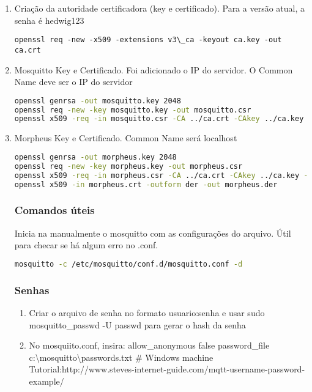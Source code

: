 \begin{enumerate}
\item
Criação da autoridade certificadora (key e certificado). Para a versão atual, a senha é hedwig123

\lstinline{openssl req -new -x509 -extensions v3\_ca -keyout ca.key -out ca.crt}
\item
Mosquitto Key e Certificado. Foi adicionado o IP do servidor. O Common Name deve ser o IP do servidor

\begin{lstlisting}[language=bash]
openssl genrsa -out mosquitto.key 2048
openssl req -new -key mosquitto.key -out mosquitto.csr
openssl x509 -req -in mosquitto.csr -CA ../ca.crt -CAkey ../ca.key -CAcreateserial -out mosquitto.crt -days 3650 -sha256    
\end{lstlisting}

\item
Morpheus Key e Certificado. Common Name será localhost

\begin{lstlisting}[language=bash]
openssl genrsa -out morpheus.key 2048
openssl req -new -key morpheus.key -out morpheus.csr
openssl x509 -req -in morpheus.csr -CA ../ca.crt -CAkey ../ca.key -CAcreateserial -out morpheus.crt -days 3650 -sha256 -addtrust clientAuth
openssl x509 -in morpheus.crt -outform der -out morpheus.der    
\end{lstlisting}

\subsubsection{Comandos úteis}
Inicia na manualmente o mosquitto com as configurações do arquivo. Útil para checar se há algum erro no .conf.
\begin{lstlisting}[language=bash]
mosquitto -c /etc/mosquitto/conf.d/mosquitto.conf -d
\end{lstlisting}

\subsubsection{Senhas}
\begin{enumerate}
\item Criar o arquivo de senha no formato usuario:senha e usar sudo mosquitto\_passwd -U passwd para gerar o hash da senha
\item No mosquiito.conf, insira:
allow\_anonymous false
password\_file c:\textbackslash mosquitto\textbackslash passwords.txt \# Windows machine
Tutorial:http://www.steves-internet-guide.com/mqtt-username-password-example/
\end{enumerate}



\end{enumerate}
